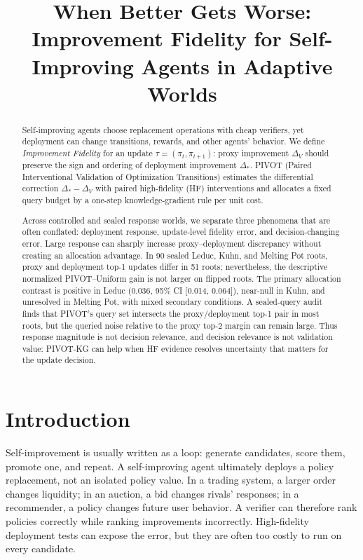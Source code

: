 \documentclass{article}
\title{When Better Gets Worse: Improvement Fidelity for Self-Improving Agents in Adaptive Worlds}
\author{}
\date{}
\begin{document}
\maketitle

\begin{abstract}
Self-improving agents choose replacement operations with cheap verifiers, yet
deployment can change transitions, rewards, and other agents' behavior. We
define \emph{Improvement Fidelity} for an update
$\tau=(\pi_t,\pi_{t+1})$: proxy improvement $\Delta_V$ should preserve the
sign and ordering of deployment improvement $\Delta_*$. PIVOT (Paired
Interventional Validation of Optimization Transitions) estimates the
differential correction $\Delta_*-\Delta_V$ with paired high-fidelity (HF)
interventions and allocates a fixed query budget by a one-step
knowledge-gradient rule per unit cost.

Across controlled and sealed response worlds, we separate three phenomena
that are often conflated: deployment response, update-level fidelity error,
and decision-changing error. Large response can sharply increase
proxy--deployment discrepancy without creating an allocation advantage. In
90 sealed Leduc, Kuhn, and Melting Pot roots, proxy and deployment top-1
updates differ in 51 roots; nevertheless, the descriptive normalized
PIVOT--Uniform gain is not larger on flipped roots. The primary allocation
contrast is positive in Leduc (0.036, 95\% CI [0.014, 0.064]), near-null in
Kuhn, and unresolved in Melting Pot, with mixed secondary conditions. A
sealed-query audit finds that PIVOT's query set intersects the proxy/deployment
top-1 pair in most roots, but the queried noise relative to the proxy top-2
margin can remain large. Thus response magnitude is not decision relevance,
and decision relevance is not validation value: PIVOT-KG can help when HF
evidence resolves uncertainty that matters for the update decision.
\end{abstract}


\section{Introduction}

Self-improvement is usually written as a loop: generate candidates, score
them, promote one, and repeat. A self-improving agent ultimately deploys a
policy replacement, not an isolated policy value. In a trading system, a
larger order changes liquidity; in an auction, a bid changes rivals'
responses; in a recommender, a policy changes future user behavior. A verifier
can therefore rank policies correctly while ranking improvements incorrectly.
High-fidelity deployment tests can expose the error, but they are often too
costly to run on every candidate.
\end{document}
